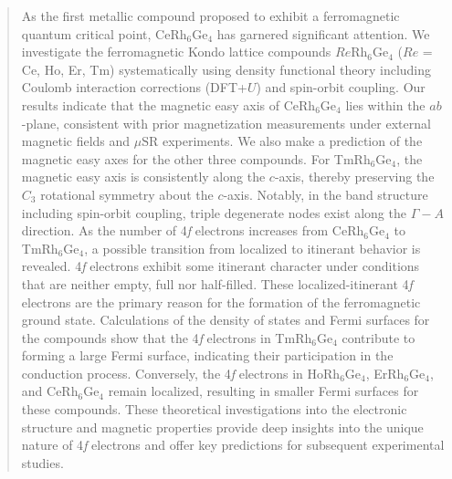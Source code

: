 \documentclass[preprint,12pt]{elsarticle}
\begin{document}
\begin{abstract}
		As the first metallic compound proposed to exhibit a ferromagnetic quantum critical point, CeRh$_6$Ge$_4$ has garnered significant attention. We investigate the ferromagnetic Kondo lattice compounds $Re$Rh$_6$Ge$_4$ ($Re$ = Ce, Ho, Er, Tm) systematically using density functional theory including Coulomb interaction corrections (DFT+$U$) and spin-orbit coupling. Our results indicate that the magnetic easy axis of CeRh$_6$Ge$_4$ lies within the $ab$-plane, consistent with prior magnetization measurements under external magnetic fields and $\mu\mathrm{SR}$ experiments. We also make a prediction of the magnetic easy axes for the other three compounds. For TmRh$_6$Ge$_4$, the magnetic easy axis is consistently along the $c$-axis, thereby preserving the $C_3$ rotational symmetry about the $c$-axis. Notably, in the band structure including spin-orbit coupling, triple degenerate nodes exist along the $\Gamma-A$ direction. As the number of 4\textit{f} electrons increases from CeRh$_6$Ge$_4$ to TmRh$_6$Ge$_4$, a possible transition from localized to itinerant behavior is revealed. 4\textit{f} electrons exhibit some itinerant character under conditions that are neither empty, full nor half-filled. These localized-itinerant 4\textit{f} electrons are the primary reason for the formation of the ferromagnetic ground state. Calculations of the density of states and Fermi surfaces for the compounds show that the 4\textit{f} electrons in TmRh$_6$Ge$_4$ contribute to forming a large Fermi surface, indicating their participation in the conduction process. Conversely, the 4\textit{f} electrons in HoRh$_6$Ge$_4$, ErRh$_6$Ge$_4$, and CeRh$_6$Ge$_4$ remain localized, resulting in smaller Fermi surfaces for these compounds. These theoretical investigations into the electronic structure and magnetic properties provide deep insights into the unique nature of 4\textit{f} electrons and offer key predictions for subsequent experimental studies.
	\end{abstract}
	
\maketitle
\end{document}
